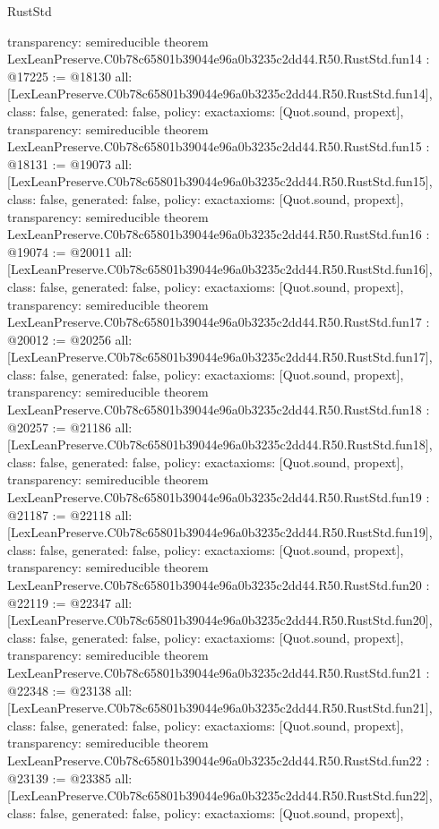 \begin{lexlean}{RustStd}
\begin{coremodule}
{  transparency: semireducible
}
theorem LexLeanPreserve.C0b78c65801b39044e96a0b3235c2dd44.R50.RustStd.fun14 : @17225 := @18130 {
  all: [LexLeanPreserve.C0b78c65801b39044e96a0b3235c2dd44.R50.RustStd.fun14],
  class: false,
  generated: false,
  policy: exact{axioms: [Quot.sound, propext]},
  transparency: semireducible
}
theorem LexLeanPreserve.C0b78c65801b39044e96a0b3235c2dd44.R50.RustStd.fun15 : @18131 := @19073 {
  all: [LexLeanPreserve.C0b78c65801b39044e96a0b3235c2dd44.R50.RustStd.fun15],
  class: false,
  generated: false,
  policy: exact{axioms: [Quot.sound, propext]},
  transparency: semireducible
}
theorem LexLeanPreserve.C0b78c65801b39044e96a0b3235c2dd44.R50.RustStd.fun16 : @19074 := @20011 {
  all: [LexLeanPreserve.C0b78c65801b39044e96a0b3235c2dd44.R50.RustStd.fun16],
  class: false,
  generated: false,
  policy: exact{axioms: [Quot.sound, propext]},
  transparency: semireducible
}
theorem LexLeanPreserve.C0b78c65801b39044e96a0b3235c2dd44.R50.RustStd.fun17 : @20012 := @20256 {
  all: [LexLeanPreserve.C0b78c65801b39044e96a0b3235c2dd44.R50.RustStd.fun17],
  class: false,
  generated: false,
  policy: exact{axioms: [Quot.sound, propext]},
  transparency: semireducible
}
theorem LexLeanPreserve.C0b78c65801b39044e96a0b3235c2dd44.R50.RustStd.fun18 : @20257 := @21186 {
  all: [LexLeanPreserve.C0b78c65801b39044e96a0b3235c2dd44.R50.RustStd.fun18],
  class: false,
  generated: false,
  policy: exact{axioms: [Quot.sound, propext]},
  transparency: semireducible
}
theorem LexLeanPreserve.C0b78c65801b39044e96a0b3235c2dd44.R50.RustStd.fun19 : @21187 := @22118 {
  all: [LexLeanPreserve.C0b78c65801b39044e96a0b3235c2dd44.R50.RustStd.fun19],
  class: false,
  generated: false,
  policy: exact{axioms: [Quot.sound, propext]},
  transparency: semireducible
}
theorem LexLeanPreserve.C0b78c65801b39044e96a0b3235c2dd44.R50.RustStd.fun20 : @22119 := @22347 {
  all: [LexLeanPreserve.C0b78c65801b39044e96a0b3235c2dd44.R50.RustStd.fun20],
  class: false,
  generated: false,
  policy: exact{axioms: [Quot.sound, propext]},
  transparency: semireducible
}
theorem LexLeanPreserve.C0b78c65801b39044e96a0b3235c2dd44.R50.RustStd.fun21 : @22348 := @23138 {
  all: [LexLeanPreserve.C0b78c65801b39044e96a0b3235c2dd44.R50.RustStd.fun21],
  class: false,
  generated: false,
  policy: exact{axioms: [Quot.sound, propext]},
  transparency: semireducible
}
theorem LexLeanPreserve.C0b78c65801b39044e96a0b3235c2dd44.R50.RustStd.fun22 : @23139 := @23385 {
  all: [LexLeanPreserve.C0b78c65801b39044e96a0b3235c2dd44.R50.RustStd.fun22],
  class: false,
  generated: false,
  policy: exact{axioms: [Quot.sound, propext]},
}
\end{coremodule}
\end{lexlean}
